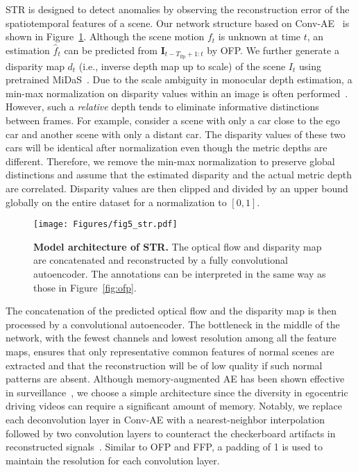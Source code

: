 STR is designed to detect anomalies by observing the reconstruction error of the spatiotemporal features of a scene. Our network structure based on Conv-AE~\citep{hasan2016learning} is shown in Figure~\ref{fig:str}. Although the scene motion $f_t$ is unknown at time $t$, an estimation $\hat{f}_t$ can be predicted from $\mathbf{I}_{t - T_\text{ffp} + 1:t}$ by OFP. We further generate a disparity map $d_t$ (i.e., inverse depth map up to scale) of the scene $I_t$ using pretrained MiDaS~\citep{ranftl2020towards}. Due to the scale ambiguity in monocular depth estimation, a min-max normalization on disparity values within an image is often performed~\citep{ranftl2020towards,godard2019digging,godard2017unsupervised}. However, such a \textit{relative} depth tends to eliminate informative distinctions between frames. For example, consider a scene with only a car close to the ego car and another scene with only a distant car. The disparity values of these two cars will be identical after normalization even though the metric depths are different. Therefore, we remove the min-max normalization to preserve global distinctions and assume that the estimated disparity and the actual metric depth are correlated. Disparity values are then clipped and divided by an upper bound globally on the entire dataset for a normalization to $[0, 1]$.

\begin{figure}[t]
  \centering
  \texttt{[image: Figures/fig5\_str.pdf]}
  \caption{\textbf{Model architecture of STR.} The optical flow and disparity map are concatenated and reconstructed by a fully convolutional autoencoder. The annotations can be interpreted in the same way as those in Figure~\ref{fig:ofp}.}
  \label{fig:str}
\end{figure}

The concatenation of the predicted optical flow and the disparity map is then processed by a convolutional autoencoder. The bottleneck in the middle of the network, with the fewest channels and lowest resolution among all the feature maps, ensures that only representative common features of normal scenes are extracted and that the reconstruction will be of low quality if such normal patterns are absent. Although memory-augmented AE has been shown effective in surveillance~\citep{gong2019memorizing,park2020learning}, we choose a simple architecture since the diversity in egocentric driving videos can require a significant amount of memory. Notably, we replace each deconvolution layer in Conv-AE with a nearest-neighbor interpolation followed by two convolution layers to counteract the checkerboard artifacts in reconstructed signals~\citep{odena2016deconvolution}. Similar to OFP and FFP, a padding of 1 is used to maintain the resolution for each convolution layer.

